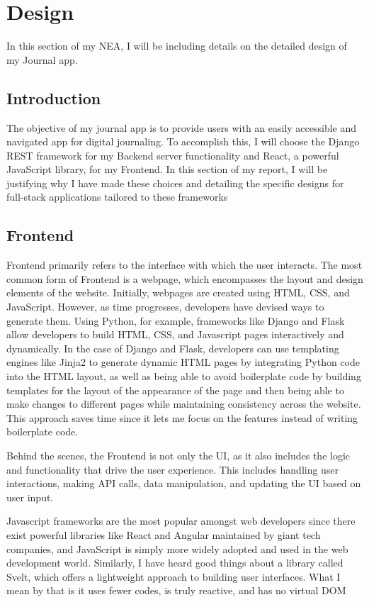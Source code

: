 \chapter{Design}
In this section of my NEA, I will be including details on the detailed design of my Journal app. 


\section{Introduction}
The objective of my journal app is to provide users with an easily accessible and navigated app for digital journaling. To accomplish this, I will choose the Django REST framework for my Backend server functionality and React, a powerful JavaScript library, for my Frontend. In this section of my report, I will be justifying why I have made these choices and detailing the specific designs for full-stack applications tailored to these frameworks

\section{Frontend}
Frontend primarily refers to the interface with which the user interacts. The most common form of Frontend is a webpage, which encompasses the layout and design elements of the website. Initially, webpages are created using HTML, CSS, and JavaScript. However, as time progresses, developers have devised ways to generate them. Using Python, for example, frameworks like Django and Flask allow developers to build HTML, CSS, and Javascript pages interactively and dynamically. In the case of Django and Flask, developers can use templating engines like Jinja2 to generate dynamic HTML pages by integrating Python code into the HTML layout, as well as being able to avoid boilerplate code by building templates for the layout of the appearance of the page and then being able to make changes to different pages while maintaining consistency across the website. This approach saves time since it lets me focus on the features instead of writing boilerplate code.

Behind the scenes, the Frontend is not only the UI, as it also includes the logic and functionality that drive the user experience. This includes handling user interactions, making API calls, data manipulation, and updating the UI based on user input.

Javascript frameworks are the most popular amongst web developers since there exist powerful libraries like React and Angular maintained by giant tech companies, and JavaScript is simply more widely adopted and used in the web development world. Similarly, I have heard good things about a library called Svelt, which offers a lightweight approach to building user interfaces. What I mean by that is it uses fewer codes, is truly reactive, and has no virtual DOM

